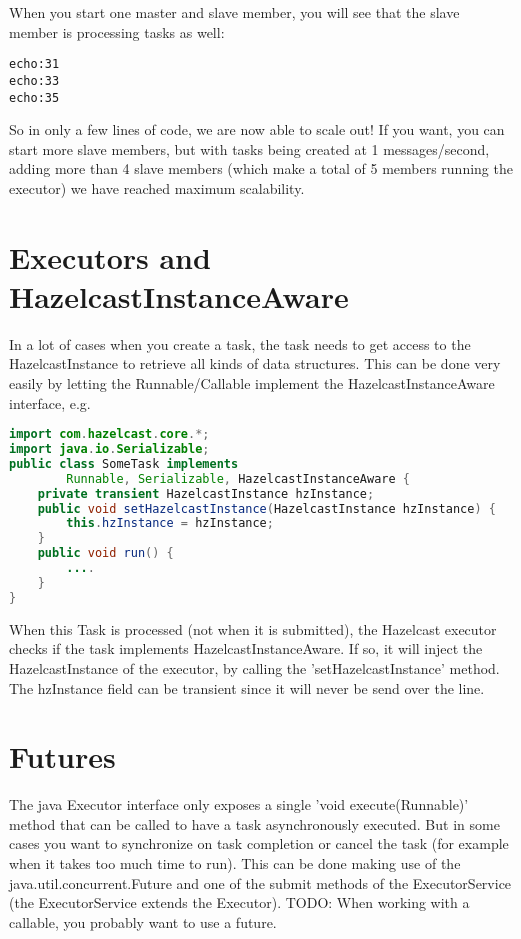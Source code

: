 When you start one master and slave member, you will see that the slave member is processing tasks as well:
\begin{lstlisting}
echo:31
echo:33
echo:35	
\end{lstlisting}
So in only a few lines of code, we are now able to scale out! If you want, you can start more slave members, but with tasks being created at 1 messages/second, adding more than 4 slave members (which make a total of 5 members running the executor) we have reached maximum scalability. 

\section{Executors and HazelcastInstanceAware}
In a lot of cases when you create a task, the task needs to get access to the HazelcastInstance to retrieve all kinds of data structures. This can be done very easily by letting the Runnable/Callable implement the HazelcastInstanceAware interface, e.g.

\begin{lstlisting}[language=java]
import com.hazelcast.core.*;
import java.io.Serializable;
public class SomeTask implements
        Runnable, Serializable, HazelcastInstanceAware {
    private transient HazelcastInstance hzInstance;
    public void setHazelcastInstance(HazelcastInstance hzInstance) {
        this.hzInstance = hzInstance;
    }
    public void run() {
        ....
    }
}
\end{lstlisting}
When this Task is processed (not when it is submitted), the Hazelcast executor checks if the task implements HazelcastInstanceAware. If so, it will inject the HazelcastInstance of the executor, by calling the 'setHazelcastInstance' method. The hzInstance field can be transient since it will never be send over the line. 

\section{Futures}
The java Executor interface only exposes a single 'void execute(Runnable)' method that can be called to have a task asynchronously executed. But in some cases you want to synchronize on task completion or cancel the task (for example when it takes too much time to run). This can be done making use of the java.util.concurrent.Future and one of the submit methods of the ExecutorService (the ExecutorService extends the Executor). TODO: When working with a callable, you probably want to use a future.

